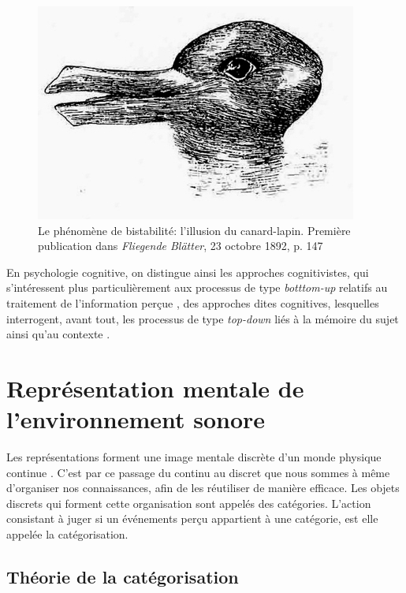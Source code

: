 \begin{figure}[bth]
        \myfloatalign
        \includegraphics[width=.6\linewidth]{gfx/canard_lapin}
        \caption[Le phénomène de bistabilité: l'illusion du canard-lapin]{Le phénomène de bistabilité: l'illusion du canard-lapin. Première publication dans \emph{Fliegende Blätter}, 23 octobre 1892, p. 147}\label{fig:bistabilite}
\end{figure}

En psychologie cognitive, on distingue ainsi les approches cognitivistes, qui s'intéressent plus particulièrement aux processus de type \emph{botttom-up} relatifs au traitement de l'information perçue , des approches dites cognitives, lesquelles interrogent, avant tout, les processus de type \emph{top-down} liés à la mémoire du sujet ainsi qu'au contexte \citep[p. ??]{guastavino_etude_2003}.

\section{Représentation mentale de l'environnement sonore}

Les représentations forment une image mentale discrète d'un monde physique continue \citep{houde1998vocabulaire}. C'est par ce passage du continu au discret que nous sommes à même d'organiser nos connaissances, afin de les réutiliser de manière efficace. Les objets discrets qui forment cette organisation sont appelés des catégories. L'action consistant à juger si un événements perçu appartient à une catégorie, est elle appelée la catégorisation.

\subsection{Théorie de la catégorisation}

